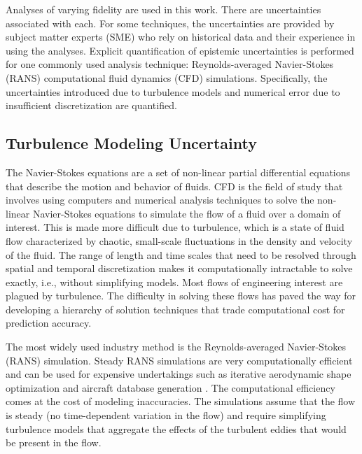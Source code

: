 Analyses of varying fidelity are used in this work.
There are uncertainties associated with each. 
For some techniques, the uncertainties are provided by subject matter experts (SME) who rely on historical data and their experience in using the analyses.
Explicit quantification of epistemic uncertainties is performed for one commonly used analysis technique: Reynolds-averaged Navier-Stokes (RANS) computational fluid dynamics (CFD) simulations.
Specifically, the uncertainties introduced due to turbulence models and numerical error due to insufficient discretization are quantified.

\subsection{Turbulence Modeling Uncertainty}
The Navier-Stokes equations are a set of non-linear partial differential equations that describe the motion and behavior of fluids.
CFD is the field of study that involves using computers and numerical analysis techniques to solve the non-linear Navier-Stokes equations to simulate the flow of a fluid over a domain of interest.
This is made more difficult due to turbulence, which is a state of fluid flow characterized by chaotic, small-scale fluctuations in the density and velocity of the fluid.
The range of length and time scales that need to be resolved through spatial and temporal discretization makes it computationally intractable to solve exactly, i.e., without simplifying models.
Most flows of engineering interest are plagued by turbulence.
The difficulty in solving these flows has paved the way for developing a hierarchy of solution techniques that trade computational cost for prediction accuracy.

The most widely used industry method is the Reynolds-averaged Navier-Stokes (RANS) simulation.
Steady RANS simulations are very computationally efficient and can be used for expensive undertakings such as iterative aerodynamic shape optimization \cite{lyu2015aerodynamic,kenway2014multipoint,chen2016aerodynamic} and aircraft database generation \cite{wendorff_combining_2016}.
The computational efficiency comes at the cost of modeling inaccuracies.
The simulations assume that the flow is steady (no time-dependent variation in the flow) and require simplifying turbulence models that aggregate the effects of the turbulent eddies that would be present in the flow.

